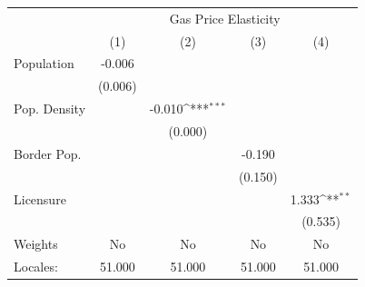 {
\def\sym#1{\ifmmode^{#1}\else\(^{#1}\)\fi}
\begin{tabular}{l*{4}{c}}
\hline\hline
            &\multicolumn{4}{c}{Gas Price Elasticity}                                               \\
            &\multicolumn{1}{c}{(1)}         &\multicolumn{1}{c}{(2)}         &\multicolumn{1}{c}{(3)}         &\multicolumn{1}{c}{(4)}         \\
\hline
Population  &      -0.006         &                     &                     &                     \\
            &     (0.006)         &                     &                     &                     \\
[1em]
Pop. Density&                     &      -0.010\sym{***}&                     &                     \\
            &                     &     (0.000)         &                     &                     \\
[1em]
Border Pop. &                     &                     &      -0.190         &                     \\
            &                     &                     &     (0.150)         &                     \\
[1em]
Licensure   &                     &                     &                     &       1.333\sym{**} \\
            &                     &                     &                     &     (0.535)         \\
\hline
Weights     &          No         &          No         &          No         &          No         \\
Locales:    &      51.000         &      51.000         &      51.000         &      51.000         \\
\hline\hline
\end{tabular}
}
